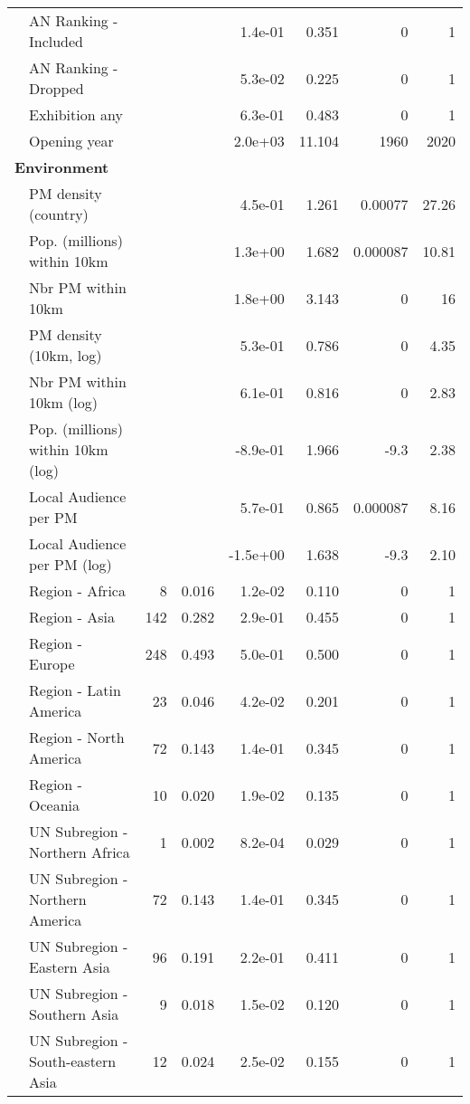 \documentclass[12pt]{article}
\begin{document}
\begin{table}[ht]
\begin{tabular}{llrrrrrr}
   & AN Ranking - Included &  &  &  1.4e-01 &  0.351 & 0 & 1 \\ 
   & AN Ranking - Dropped &  &  &  5.3e-02 &  0.225 & 0 & 1 \\ 
   & Exhibition any &  &  &  6.3e-01 &  0.483 & 0 & 1 \\ 
   & Opening year &  &  &  2.0e+03 & 11.104 & 1960 & 2020 \\ 
   \multicolumn{8}{l}{\textbf{Environment}} \\ 
 & PM density (country) &  &  &  4.5e-01 &  1.261 & 0.00077 & 27.26 \\ 
   & Pop. (millions) within 10km &  &  &  1.3e+00 &  1.682 & 0.000087 & 10.81 \\ 
   & Nbr PM within 10km &  &  &  1.8e+00 &  3.143 & 0 & 16 \\ 
   & PM density (10km, log) &  &  &  5.3e-01 &  0.786 & 0 & 4.35 \\ 
   & Nbr PM within 10km (log) &  &  &  6.1e-01 &  0.816 & 0 & 2.83 \\ 
   & Pop. (millions) within 10km (log) &  &  & -8.9e-01 &  1.966 & -9.3 & 2.38 \\ 
   & Local Audience per PM &  &  &  5.7e-01 &  0.865 & 0.000087 & 8.16 \\ 
   & Local Audience per PM (log) &  &  & -1.5e+00 &  1.638 & -9.3 & 2.10 \\ 
   & Region - Africa & 8 & 0.016 &  1.2e-02 &  0.110 & 0 & 1 \\ 
   & Region - Asia & 142 & 0.282 &  2.9e-01 &  0.455 & 0 & 1 \\ 
   & Region - Europe & 248 & 0.493 &  5.0e-01 &  0.500 & 0 & 1 \\ 
   & Region - Latin America & 23 & 0.046 &  4.2e-02 &  0.201 & 0 & 1 \\ 
   & Region - North America & 72 & 0.143 &  1.4e-01 &  0.345 & 0 & 1 \\ 
   & Region - Oceania & 10 & 0.020 &  1.9e-02 &  0.135 & 0 & 1 \\ 
   & UN Subregion - Northern Africa & 1 & 0.002 &  8.2e-04 &  0.029 & 0 & 1 \\ 
   & UN Subregion - Northern America & 72 & 0.143 &  1.4e-01 &  0.345 & 0 & 1 \\ 
   & UN Subregion - Eastern Asia & 96 & 0.191 &  2.2e-01 &  0.411 & 0 & 1 \\ 
   & UN Subregion - Southern Asia & 9 & 0.018 &  1.5e-02 &  0.120 & 0 & 1 \\ 
   & UN Subregion - South-eastern Asia & 12 & 0.024 &  2.5e-02 &  0.155 & 0 & 1 \\ 

\end{tabular}
\end{table}
\end{document}
